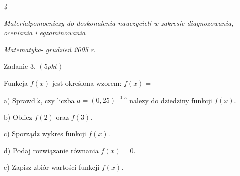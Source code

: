 \documentclass[a4paper,12pt]{article}
\begin{document}
{\it 4}

{\it Materialpomocniczy do doskonalenia nauczycieli w zakresie diagnozowania, oceniania i egzaminowania}

{\it Matematyka}- {\it grudzień 2005 r}.

Zadanie 3. $(5pkt)$

Funkcja $f(x)$ jest określona wzorem: $f(x)=$

a) Sprawd $\acute{\mathrm{z}}$, czy liczba $a=(0,25)^{-0,5}$ nalezy do dziedziny funkcji $f(x).$

b) Oblicz $f(2)$ oraz $f(3).$

c) Sporządz$\acute{}$ wykres funkcji $f(x).$

d) Podaj rozwiązanie równania $f(x)=0.$

e) Zapisz zbiór wartości funkcji $f(x).$
\end{document}

